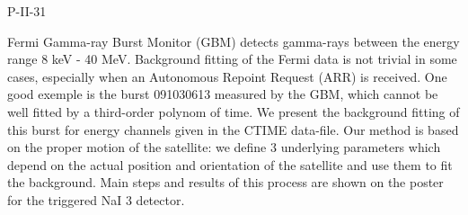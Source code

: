 P-II-31


\bigskip



\bigskip

\noindent Fermi Gamma-ray Burst Monitor (GBM) detects gamma-rays between the
energy range 8 keV - 40 MeV. Background fitting of the Fermi data is
not trivial in some cases, especially when an Autonomous Repoint
Request (ARR) is received. One good exemple is the burst 091030613
measured by the GBM, which cannot be well fitted by a third-order
polynom of time. We present the background fitting of this burst for
energy channels given in the CTIME data-file. Our method is based on
the proper motion of the satellite: we define 3 underlying parameters
which depend on the actual position and orientation of the satellite
and use them to fit the background. Main steps and results of this
process are shown on the poster for the triggered NaI 3 detector.
